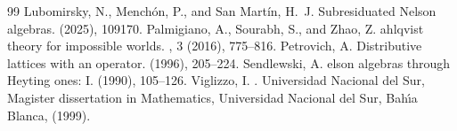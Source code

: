 \documentclass[10pt,a4paper]{amsart}
\begin{document}
\begin{thebibliography}{99}
 {\sc Lubomirsky, N., Mench{\'o}n, P., and {San Martín}, H.~J.} \newblock Subresiduated {N}elson algebras.  (2025), 109170.
 {\sc Palmigiano, A., Sourabh, S., and Zhao, Z.} ahlqvist theory for impossible worlds. , 3 (2016), 775--816.
 {\sc Petrovich, A.} \newblock Distributive lattices with an operator.  (1996), 205--224.
 {\sc Sendlewski, A.} elson algebras through {H}eyting ones: I.  (1990), 105--126.
 {\sc Viglizzo, I.} . \newblock Universidad Nacional del Sur,  \newblock Magister dissertation in Mathematics, Universidad Nacional del Sur, Bah{\'{\i}}a Blanca, (1999).
\end{thebibliography}
\end{document}
